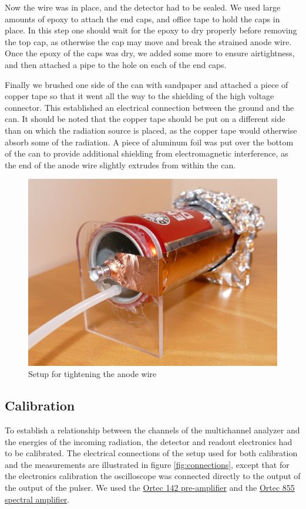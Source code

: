 \documentclass[a4paper]{article}
\begin{document}
Now the wire was in place, and the detector had to be sealed.
We used large amounts of epoxy to attach the end caps, and office tape to hold the caps in place.
In this step one should wait for the epoxy to dry properly before removing the top cap, as otherwise the cap may move and break the strained anode wire.
Once the epoxy of the caps was dry, we added some more to ensure airtightness, and then attached a pipe to the hole on each of the end caps.

Finally we brushed one side of the can with sandpaper and attached a piece of copper tape so that it went all the way to the shielding of the high voltage connector.
This established an electrical connection between the ground and the can.
It should be noted that the copper tape should be put on a different side than on which the radiation source is placed, as the copper tape would otherwise absorb some of the radiation.
A piece of aluminum foil was put over the bottom of the can to provide additional shielding from electromagnetic interference, as the end of the anode wire slightly extrudes from within the can.

\begin{figure}[ht!]
\centering
\includegraphics[width=\textwidth]{fig/P1170847-cropped.jpg}
\caption{Setup for tightening the anode wire}
\label{fig:tightening}
\end{figure}


\clearpage
\subsection{Calibration}
\label{setup_calibration}
To establish a relationship between the channels of the multichannel analyzer and the energies of the incoming radiation, the detector and readout electronics had to be calibrated.
The electrical connections of the setup used for both calibration and the measurements are illustrated in figure \ref{fig:connections}, except that for the electronics calibration the oscilloscope was connected directly to the output of the output of the pulser.
We used the
\href{https://www.ortec-online.com/products/electronics/preamplifiers/142a-b-c}{Ortec 142 pre-amplifier}
and the
\href{https://www.ortec-online.com/products/electronics/amplifiers/855}{Ortec 855 spectral amplifier}.
\end{document}
